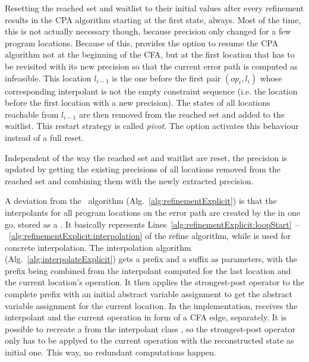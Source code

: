 Resetting the reached set and waitlist to their initial values after every refinement results in the CPA algorithm starting at the first state, always.
Most of the time, this is not actually necessary though, because precision only changed for a few program locations.
Because of this, \cpaChecker provides the option to resume the CPA algorithm not at the beginning of the CFA, but at the first location that has to be revisited with its new precision so that the current error path is computed as infeasible.
This location $l_{i-1}$ is the one before the first pair $(op_i, l_i)$ whose corresponding interpolant is not the empty constraint sequence (i.e. the location before the first location with a new precision).
The states of all locations reachable from $l_{i-1}$ are then removed from the reached set and added to the waitlist.
This restart strategy is called \emph{pivot}.
The option  activates this behaviour instead of a full reset.\cite{CITATION NEEDED}

Independent of the way the reached set and waitlist are reset, the precision is updated by getting the existing precisions of all locations removed from the reached set and combining them with the newly extracted precision.

A deviation from the \ algorithm (Alg.~\ref{alg:refinementExplicit}) is that the interpolants for all program locations on the error path are created by the  in one go, stored as a .
It basically represents Lines~\ref{alg:refinementExplicit:loopStart}~--~\ref{alg:refinementExplicit:interpolation} of the refine algorithm, while  is used for concrete interpolation.
The interpolation algorithm (Alg.~\ref{alg:interpolateExplicit}) gets a prefix and a suffix as parameters, with the prefix being combined from the interpolant computed for the last location and the current location's operation. It then applies the strongest-post operator to the complete prefix with an initial abstract variable assignment to get the abstract variable assignment for the current location.
In the implementation,  receives the interpolant and the current operation in form of a CFA edge, separately.
It is possible to recreate a  from the interpolant class , so the strongest-post operator only has to be applyed to the current operation with the reconstructed state as initial one. This way, no redundant computations happen.

